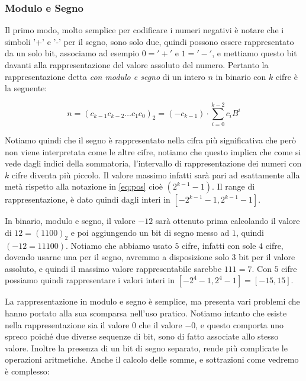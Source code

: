 \subsubsection{Modulo e Segno}

Il primo modo, molto semplice per codificare i numeri negativi è notare che i simboli '+' e '-' per il segno, sono solo due, quindi possono essere rappresentato da un solo bit, associamo ad esempio $0 = '+'$ e $1 = '-'$, e mettiamo questo bit davanti alla rappresentazione del valore assoluto del numero. Pertanto la rappresentazione detta \emph{con modulo e segno} di un intero $n$ in binario con $k$ cifre è la seguente:

\[ n = (c_{k-1}c_{k-2}{\ldots}c_1c_0)_2 = (-c_{k-1}) \cdot \sum_{i=0}^{k-2}c_iB^i \]

Notiamo quindi che il segno è rappresentato nella cifra più significativa che però non viene interpretata come le altre cifre, notiamo che questo implica che come si vede dagli indici della sommatoria, l'intervallo di rappresentazione dei numeri con $k$ cifre diventa più piccolo. Il valore massimo infatti sarà pari ad esattamente alla metà rispetto alla notazione in \eqref{eq:pos} cioè $(2^{k-1}-1)$. Il range di rappresentazione, è dato quindi dagli interi in $[-2^{k-1}-1,2^{k-1}-1]$.

\begin{ex} In binario, modulo e segno, il valore $-12$ sarà ottenuto prima
calcolando il valore di $12 = (1100)_2$ e poi aggiungendo un bit di segno messo
ad $1$, quindi $(-12 = 11100)$. Notiamo che abbiamo usato $5$ cifre, infatti
con sole $4$ cifre, dovendo usarne una per il segno, avremmo a disposizione
solo $3$ bit per il valore assoluto, e quindi il massimo valore rappresentabile
sarebbe $111 = 7$. Con $5$ cifre possiamo quindi rappresentare i valori interi
in $[-2^4-1,2^4-1] = [-15,15]$. \end{ex}

La rappresentazione in modulo e segno è semplice, ma presenta vari problemi che hanno portato alla sua scomparsa nell'uso pratico. Notiamo intanto che esiste nella rappresentazione sia il valore $0$ che il valore $-0$, e questo comporta uno spreco poiché due diverse sequenze di bit, sono di fatto associate allo stesso valore. Inoltre la presenza di un bit di segno separato, rende più complicate le operazioni aritmetiche. Anche il calcolo delle somme, e sottrazioni come vedremo è complesso:

